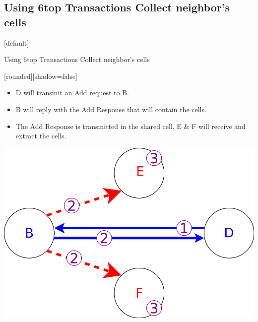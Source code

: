\documentclass{beamer}
\makeatletter
\newenvironment{withoutheadline}{
        \setbeamertemplate{headline}[default]
        \def\beamer@entrycode{\vspace*{-\headheight}}
    }{}
\makeatother
\begin{document}
\subsection{Using 6top Transactions Collect neighbor's cells}
\begin{withoutheadline}
\begin{frame}{Using 6top Transactions Collect neighbor's cells}


[rounded][shadow=false]


\begin{block}

    \begin{itemize}
    \item D will transmit an Add request to B.
    \item<2-> B will reply with the Add Response that will contain the cells. 
    \item<3-> The Add Response is transmitted in the shared cell, E \& F will receive and extract the cells.  
    
    \end{itemize}
    \end{block}

\centering

\begin{center}
\includegraphics[width=0.6\linewidth]{using6top.png}

\end{center}

\end{frame}
\end{withoutheadline}
\end{document}
